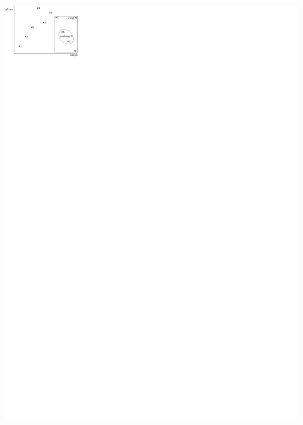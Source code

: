 \documentclass[brazil]{article}
\begin{document}
\begin{figure}
{    \includegraphics{cspace-7420}
    \label{fig:c-space7420}
  }
  \subfigure[Cseg N]{
}
\end{figure}
\end{document}
